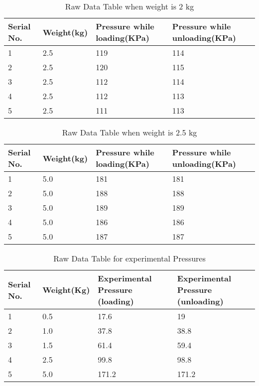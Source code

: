 \documentclass[12pt,a4paper]{article}
\begin{document}
\begin{table}[!ht]
\begin{center}
\begin{tabular}{|p{2cm}|p{2cm}|p{6cm}|p{6cm}|}
\hline
Serial No. & Weight(kg) & Pressure while loading(KPa) & Pressure while unloading(KPa) \\
\hline
1 & 2.5 & 119 & 114\\
2 & 2.5 & 120 & 115\\
3 & 2.5 & 112 & 114\\
4 & 2.5 & 112 & 113\\
5 & 2.5 & 111 & 113\\
\hline
\end{tabular}
\caption{Raw Data Table when weight is 2 kg}
\end{center}
\end{table}
\clearpage
\begin{table}[!ht]
\begin{center}
\begin{tabular}{|p{2cm}|p{2cm}|p{6cm}|p{6cm}|}
\hline
Serial No. & Weight(kg) & Pressure while loading(KPa) & Pressure while unloading(KPa) \\
\hline
1 & 5.0 & 181 & 181\\
2 & 5.0 & 188 & 188\\
3 & 5.0 & 189 & 189\\
4 & 5.0 & 186 & 186\\
5 & 5.0 & 187 & 187\\
\hline
\end{tabular}
\caption{Raw Data Table when weight is 2.5 kg}
\end{center}
\end{table}
\begin{table}[!ht]
\begin{center}
\begin{tabular}{|p{2cm}|p{2cm}|p{6cm}|p{6.5cm}|}
\hline
Serial No. & Weight(Kg) & Experimental Pressure (loading) & Experimental Pressure (unloading)\\
\hline
1 & 0.5 & 17.6 & 19\\
2 & 1.0 & 37.8 & 38.8\\
3 & 1.5 & 61.4 & 59.4\\
4 & 2.5 & 99.8 & 98.8\\
5 & 5.0 & 171.2 & 171.2\\
\hline
\end{tabular}
\caption{Raw Data Table for experimental Pressures}
\end{center}
\end{table}
\end{document}

